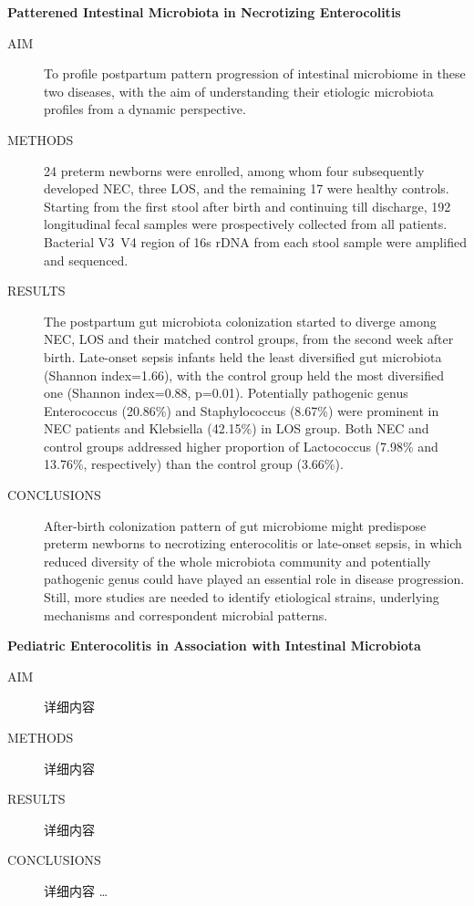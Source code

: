 \begin{englishabstract}
  \textbf{Patterened Intestinal Microbiota in Necrotizing Enterocolitis}
    \begin{description}
      \item[AIM] To profile postpartum pattern progression of intestinal microbiome in these two diseases, with the aim of understanding their etiologic microbiota profiles from a dynamic perspective.
      \item[METHODS] 24 preterm newborns were enrolled, among whom four subsequently developed NEC, three LOS, and the remaining 17 were healthy controls. Starting from the first stool after birth and continuing till discharge, 192 longitudinal fecal samples were prospectively collected from all patients. Bacterial V3~V4 region of 16s rDNA from each stool sample were amplified and sequenced.
      \item[RESULTS] The postpartum gut microbiota colonization started to diverge among NEC, LOS and their matched control groups, from the second week after birth.  Late-onset sepsis infants held the least diversified gut microbiota (Shannon index=1.66), with the control group held the most diversified one (Shannon index=0.88, p=0.01). Potentially pathogenic genus Enterococcus (20.86\%) and Staphylococcus (8.67\%) were prominent in NEC patients and Klebsiella (42.15\%) in LOS group. Both NEC and control groups addressed higher proportion of Lactococcus (7.98\% and 13.76\%, respectively) than the control group (3.66\%).
      \item[CONCLUSIONS] After-birth colonization pattern of gut microbiome might predispose preterm newborns to necrotizing enterocolitis or late-onset sepsis, in which reduced diversity of the whole microbiota community and potentially pathogenic genus could have played an essential role in disease progression. Still, more studies are needed to identify etiological strains, underlying mechanisms and correspondent microbial patterns. 
    \end{description}

  \textbf{Pediatric Enterocolitis in Association with Intestinal Microbiota}
    \begin{description}
      \item[AIM] 详细内容
      \item[METHODS] 详细内容
      \item[RESULTS] 详细内容
      \item[CONCLUSIONS] 详细内容 \ldots
    \end{description}
\end{englishabstract}
